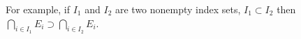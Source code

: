 \documentclass[preview]{standalone}
\begin{document}
\begin{center}
For example, if $I_1$ and $I_2$ are two nonempty index sets, $I_1 \subset I_2$ then $\bigcap_{i \in I_1} E_i \supset \bigcap_{i \in I_2} E_i$.
\end{center}
\end{document}
